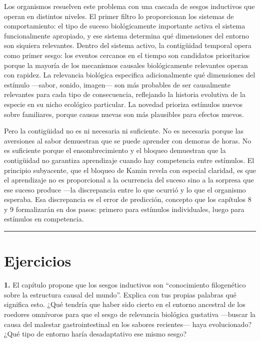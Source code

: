 \documentclass[
  letterpaper,
  DIV=11,
  numbers=noendperiod]{scrreprt}
\begin{document}
\begin{tcolorbox}[enhanced jigsaw, arc=.35mm, bottomrule=.15mm, breakable, colback=white, colframe=quarto-callout-note-color-frame, left=2mm, leftrule=.75mm, opacityback=0, rightrule=.15mm, toprule=.15mm]
Los organismos resuelven este problema con una cascada de sesgos
inductivos que operan en distintos niveles. El primer filtro lo
proporcionan los sistemas de comportamiento: el tipo de suceso
biológicamente importante activa el sistema funcionalmente apropiado, y
ese sistema determina qué dimensiones del entorno son siquiera
relevantes. Dentro del sistema activo, la contigüidad temporal opera
como primer sesgo: los eventos cercanos en el tiempo son candidatos
prioritarios porque la mayoría de los mecanismos causales biológicamente
relevantes operan con rapidez. La relevancia biológica especifica
adicionalmente qué dimensiones del estímulo ---sabor, sonido, imagen---
son más probables de ser causalmente relevantes para cada tipo de
consecuencia, reflejando la historia evolutiva de la especie en su nicho
ecológico particular. La novedad prioriza estímulos nuevos sobre
familiares, porque causas nuevas son más plausibles para efectos nuevos.

Pero la contigüidad no es ni necesaria ni suficiente. No es necesaria
porque las aversiones al sabor demuestran que se puede aprender con
demoras de horas. No es suficiente porque el ensombrecimiento y el
bloqueo demuestran que la contigüidad no garantiza aprendizaje cuando
hay competencia entre estímulos. El principio subyacente, que el bloqueo
de Kamin revela con especial claridad, es que el aprendizaje no es
proporcional a la ocurrencia del suceso sino a la sorpresa que ese
suceso produce ---la discrepancia entre lo que ocurrió y lo que el
organismo esperaba. Esa discrepancia es el error de predicción, concepto
que los capítulos 8 y 9 formalizarán en dos pasos: primero para
estímulos individuales, luego para estímulos en competencia.

\begin{center}\rule{0.5\linewidth}{0.5pt}\end{center}

\section{Ejercicios}\label{ejercicios}

\textbf{1.} El capítulo propone que los sesgos inductivos son
``conocimiento filogenético sobre la estructura causal del mundo''.
Explica con tus propias palabras qué significa esto. ¿Qué tendría que
haber sido cierto en el entorno ancestral de los roedores omnívoros para
que el sesgo de relevancia biológica gustativa ---buscar la causa del
malestar gastrointestinal en los sabores recientes--- haya evolucionado?
¿Qué tipo de entorno haría desadaptativo ese mismo sesgo?


\end{tcolorbox}
\end{document}
